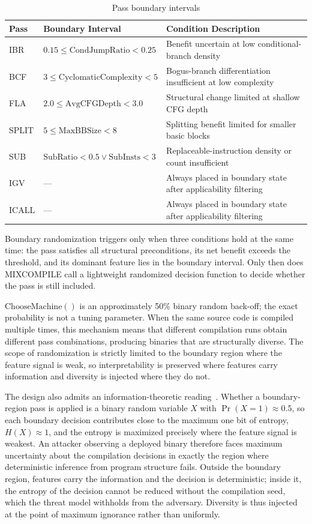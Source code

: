 \documentclass[5p,times,authoryear]{elsarticle}
\theoremstyle{plain}
\theoremstyle{definition}
\theoremstyle{remark}
\begin{document}
\begin{table}[!t]
\centering
\footnotesize
\caption{Pass boundary intervals}
\label{tab:boundary}
\begin{tabular}{llp{}}
\toprule
Pass & Boundary Interval & Condition Description \\
\midrule
IBR & $0.15 \leq \text{CondJumpRatio} < 0.25$ & Benefit uncertain at low conditional-branch density \\
BCF & $3 \leq \text{CyclomaticComplexity} < 5$ & Bogus-branch differentiation insufficient at low complexity \\
FLA & $2.0 \leq \text{AvgCFGDepth} < 3.0$ & Structural change limited at shallow CFG depth \\
SPLIT & $5 \leq \text{MaxBBSize} < 8$ & Splitting benefit limited for smaller basic blocks \\
SUB & $\text{SubRatio} < 0.5 \lor \text{SubInsts} < 3$ & Replaceable-instruction density or count insufficient \\
IGV & --- & Always placed in boundary state after applicability filtering \\
ICALL & --- & Always placed in boundary state after applicability filtering \\
\bottomrule
\end{tabular}
\end{table}

Boundary randomization triggers only when three conditions hold at the same time: the
pass satisfies all structural preconditions, its net benefit exceeds the threshold, and
its dominant feature lies in the boundary interval. Only then does MIXCOMPILE call a
lightweight randomized decision function to decide whether the pass is still included.

$\text{ChooseMachine}()$ is an approximately 50\% binary random back-off; the exact
probability is not a tuning parameter. When the same source code is compiled
multiple times, this mechanism means that different compilation runs obtain different
pass combinations, producing binaries that are structurally diverse. The scope of
randomization is strictly limited to the boundary region where the feature signal is
weak, so interpretability is preserved where features carry information and diversity
is injected where they do not.

The design also admits an information-theoretic reading~\cite{shannon1948mathematical}.
Whether a boundary-region pass is applied is a binary random variable $X$ with
$\Pr(X{=}1) \approx 0.5$, so each boundary decision contributes close to the maximum
one bit of entropy, $H(X) \approx 1$, and the entropy is maximized precisely where
the feature signal is weakest. An attacker observing a deployed binary therefore
faces maximum uncertainty about the compilation decisions in exactly the region where
deterministic inference from program structure fails. Outside the boundary region,
features carry the information and the decision is deterministic; inside it, the
entropy of the decision cannot be reduced without the compilation seed, which the
threat model withholds from the adversary. Diversity is thus injected at the point of
maximum ignorance rather than uniformly.
\end{document}

